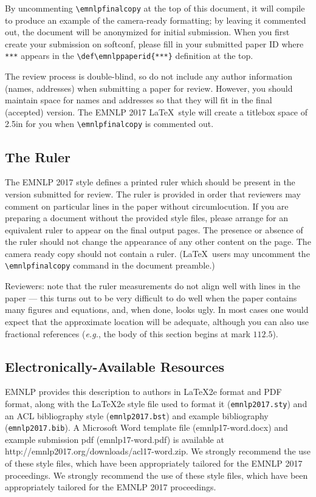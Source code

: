By uncommenting {\small\verb|\emnlpfinalcopy|} at the top of this document,
it will compile to produce an example of the camera-ready formatting; by
leaving it commented out, the document will be anonymized for initial
submission.  When you first create your submission on softconf, please fill
in your submitted paper ID where {\small\verb|***|} appears in the
{\small\verb|\def\emnlppaperid{***}|} definition at the top.

The review process is double-blind, so do not include any author information
(names, addresses) when submitting a paper for review. However, you should
maintain space for names and addresses so that they will fit in the final
(accepted) version.  The EMNLP 2017 \LaTeX\ style will create a titlebox
space of 2.5in for you when {\small\verb|\emnlpfinalcopy|} is commented out.

\subsection{The Ruler}
The EMNLP 2017 style defines a printed ruler which should be present in the
version submitted for review.  The ruler is provided in order that
reviewers may comment on particular lines in the paper without
circumlocution.  If you are preparing a document without the provided
style files, please arrange for an equivalent ruler to
appear on the final output pages.  The presence or absence of the ruler
should not change the appearance of any other content on the page.  The
camera ready copy should not contain a ruler. (\LaTeX\ users may uncomment
the {\small\verb|\emnlpfinalcopy|} command in the document preamble.)  

Reviewers:
note that the ruler measurements do not align well with lines in the paper
--- this turns out to be very difficult to do well when the paper contains
many figures and equations, and, when done, looks ugly.  In most cases one 
would expect that the approximate location will be adequate, although you 
can also use fractional references ({\em e.g.}, the body of this section 
begins at mark $112.5$).

\subsection{Electronically-Available Resources}

EMNLP provides this description to authors in \LaTeX2e{} format
and PDF format, along with the \LaTeX2e{} style file used to format it
({\small\tt emnlp2017.sty}) and an ACL bibliography style
({\small\tt emnlp2017.bst}) and example bibliography
({\small\tt emnlp2017.bib}). 
A Microsoft Word template file (emnlp17-word.docx) and example submission pdf (emnlp17-word.pdf) is available at http://emnlp2017.org/downloads/acl17-word.zip. We strongly recommend the use of these style files, which have been appropriately tailored for the EMNLP 2017 proceedings.
We strongly recommend the use of these style files, which have been 
appropriately tailored for the EMNLP 2017 proceedings.


